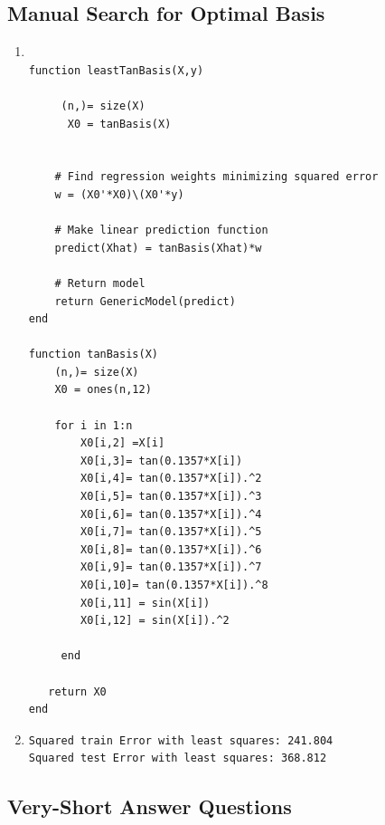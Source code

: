 \documentclass{article}
\begin{document}
\subsection{Manual Search for Optimal Basis}

\begin{enumerate}
\item
 \begin{verbatim}

function leastTanBasis(X,y)

     (n,)= size(X)
      X0 = tanBasis(X)


    # Find regression weights minimizing squared error
    w = (X0'*X0)\(X0'*y)

    # Make linear prediction function
    predict(Xhat) = tanBasis(Xhat)*w

    # Return model
    return GenericModel(predict)
end

function tanBasis(X)
    (n,)= size(X)
    X0 = ones(n,12)

    for i in 1:n
        X0[i,2] =X[i]
        X0[i,3]= tan(0.1357*X[i])
        X0[i,4]= tan(0.1357*X[i]).^2
        X0[i,5]= tan(0.1357*X[i]).^3
        X0[i,6]= tan(0.1357*X[i]).^4
        X0[i,7]= tan(0.1357*X[i]).^5
        X0[i,8]= tan(0.1357*X[i]).^6
        X0[i,9]= tan(0.1357*X[i]).^7
        X0[i,10]= tan(0.1357*X[i]).^8
        X0[i,11] = sin(X[i])  
        X0[i,12] = sin(X[i]).^2  
         
     end 

   return X0
end

 \end{verbatim}


\item

  \begin{verbatim}
Squared train Error with least squares: 241.804 
Squared test Error with least squares: 368.812
  \end{verbatim}

\end{enumerate}

\subsection{Very-Short Answer Questions}
\end{document}
